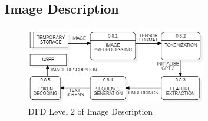 \subsection{Image Description}

\begin{figure}[h!]  
    \centering
    \includegraphics[width=0.7\textwidth]{Images/DFD L2 ID.png}  
    \caption{DFD Level 2 of Image Description}
    \label{dfdl122}  %
\end{figure}

